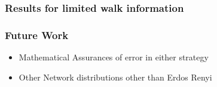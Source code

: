 \documentclass[a4paper,12pt]{beamer}
\begin{document}
\begin{frame}
  \frametitle{Results for limited walk information}
\end{frame}


\begin{frame}
  \frametitle{Future Work}
  \begin{itemize}
    \item Mathematical Assurances of error in either strategy
    \item Other Network distributions other than Erdos Renyi
  \end{itemize}
\end{frame}



\end{document}
